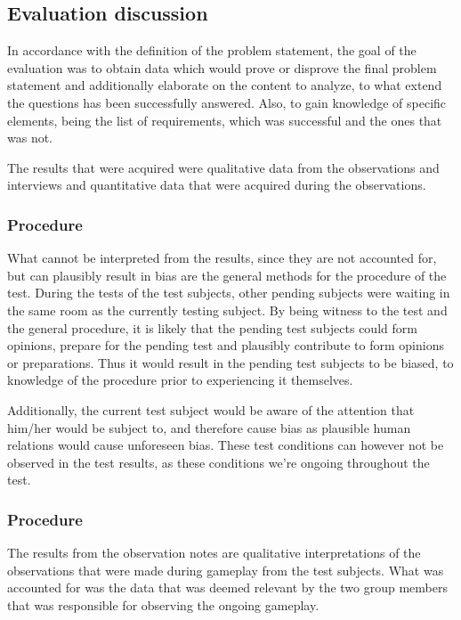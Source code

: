 \subsection{Evaluation discussion} \label{sec:evaldisc}
In accordance with the definition of the problem statement, the goal of the evaluation was to obtain data which would prove or disprove the final problem statement and additionally elaborate on the content to analyze, to what extend the questions has been successfully answered. 
Also, to gain knowledge of specific elements, being the list of requirements, which was successful and the ones that was not.

The results that were acquired were qualitative data from the observations and interviews and quantitative data that were acquired during the observations. 

\subsubsection*{Procedure}
What cannot be interpreted from the results, since they are not accounted for, but can plausibly result in bias are the general methods for the procedure of the test. 
During the tests of the test subjects, other pending subjects were waiting in the same room as the currently testing subject.
By being witness to the test and the general procedure, it is likely that the pending test subjects could form opinions, prepare for the pending test and plausibly contribute to form opinions or preparations. 
Thus it would result in the pending test subjects to be biased, to knowledge of the procedure prior to experiencing it themselves.

\noindent Additionally, the current test subject would be aware of the attention that him/her would be subject to, and therefore cause bias as plausible human relations would cause unforeseen bias. These test conditions can however not be observed in the test results, as these conditions we’re ongoing throughout the test.


\subsubsection*{Procedure}
The results from the observation notes are qualitative interpretations of the observations that were made during gameplay from the test subjects. 
What was accounted for was the data that was deemed relevant by the two group members that was responsible for observing the ongoing gameplay.
\bigskip

